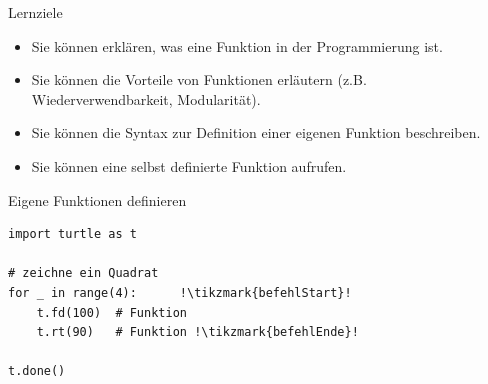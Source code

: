 \begin{frame}{Lernziele}
    \begin{itemize}
        \item Sie können erklären, was eine Funktion in der Programmierung ist.
        \item Sie können die Vorteile von Funktionen erläutern (z.B. Wiederverwendbarkeit, Modularität).
        \item Sie können die Syntax zur Definition einer eigenen Funktion beschreiben.
        \item Sie können eine selbst definierte Funktion aufrufen.
    \end{itemize}
\end{frame}

\begin{frame}[fragile]{Eigene Funktionen definieren}
\begin{lstlisting}[escapechar=!]
import turtle as t

# zeichne ein Quadrat
for _ in range(4):      !\tikzmark{befehlStart}!
    t.fd(100)  # Funktion  
    t.rt(90)   # Funktion !\tikzmark{befehlEnde}!
    
t.done()
\end{lstlisting}
\end{frame}

